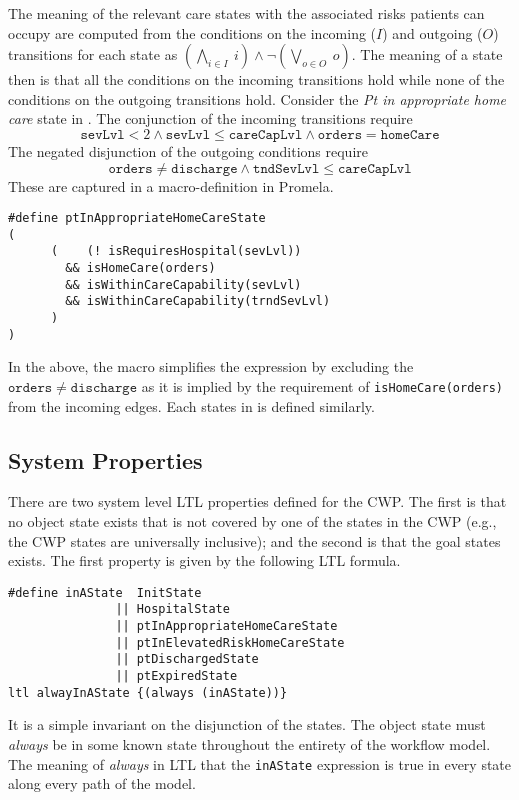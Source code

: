 The meaning of the relevant care states with the associated risks patients can occupy are computed from the conditions on the incoming ($I$) and outgoing ($O$) transitions for each state as $(\bigwedge_{i \in I}\ i) \wedge \neg(\bigvee_{o \in O}\ o)$. The meaning of a state then is that all the conditions on the incoming transitions hold while none of the conditions on the outgoing transitions hold. Consider the \emph{Pt in appropriate home care} state in . The conjunction of the incoming transitions require
%
\[
  \mathtt{sevLvl} < 2 \wedge \mathtt{sevLvl} \le \mathtt{careCapLvl} \wedge \mathtt{orders} = \mathtt{homeCare}
\]
%
The negated disjunction of the outgoing conditions require
%
\[
  \mathtt{orders} \neq \mathtt{discharge} \wedge \mathtt{tndSevLvl} \le \mathtt{careCapLvl}
\]
%
\noindent These are captured in a macro-definition in Promela.
%
{\small
\begin{lstlisting}[style=myPromela]
#define ptInAppropriateHomeCareState
(
      (    (! isRequiresHospital(sevLvl))
        && isHomeCare(orders)                                      
        && isWithinCareCapability(sevLvl)
        && isWithinCareCapability(trndSevLvl)
      )
)
\end{lstlisting}
}
%
\noindent In the above, the macro simplifies the expression by excluding the $\mathtt{orders} \neq \mathtt{discharge}$ as it is implied by the requirement of \texttt{isHomeCare(orders)} from the incoming edges. Each states in  is defined similarly.

\subsection{System Properties}
There are two system level LTL properties defined for the CWP. The first is that no object state exists that is not covered by one of the states in the CWP (e.g., the CWP states are universally inclusive); and the second is that the goal states exists. The first property is given by the following LTL formula.
%
{\small
\begin{lstlisting}[style=myPromela]
#define inAState  InitState
               || HospitalState
               || ptInAppropriateHomeCareState
               || ptInElevatedRiskHomeCareState
               || ptDischargedState
               || ptExpiredState
ltl alwayInAState {(always (inAState))}
\end{lstlisting}
}
%
\noindent It is a simple invariant on the disjunction of the states. The object state must \emph{always} be in some known state throughout the entirety of the workflow model. The meaning of \emph{always} in LTL that the \texttt{inAState} expression is true in every state along every path of the model.

